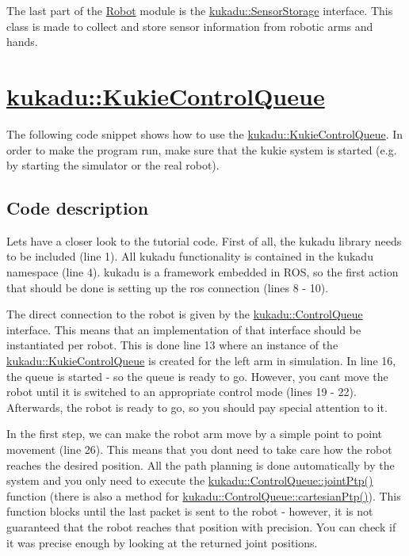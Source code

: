 The last part of the \hyperlink{group__Robot}{Robot} module is the \hyperlink{classkukadu_1_1SensorStorage}{kukadu\+::\+Sensor\+Storage} interface. This class is made to collect and store sensor information from robotic arms and hands.

\section*{\hyperlink{classkukadu_1_1KukieControlQueue}{kukadu\+::\+Kukie\+Control\+Queue}}

The following code snippet shows how to use the \hyperlink{classkukadu_1_1KukieControlQueue}{kukadu\+::\+Kukie\+Control\+Queue}. In order to make the program run, make sure that the kukie system is started (e.\+g. by starting the simulator or the real robot). 
\begin{DoxyCodeInclude}
\end{DoxyCodeInclude}


\subsection*{Code description}

Lets have a closer look to the tutorial code. First of all, the kukadu library needs to be included (line 1). All kukadu functionality is contained in the kukadu namespace (line 4). kukadu is a framework embedded in R\+OS, so the first action that should be done is setting up the ros connection (lines 8 -\/ 10).

The direct connection to the robot is given by the \hyperlink{classkukadu_1_1ControlQueue}{kukadu\+::\+Control\+Queue} interface. This means that an implementation of that interface should be instantiated per robot. This is done line 13 where an instance of the \hyperlink{classkukadu_1_1KukieControlQueue}{kukadu\+::\+Kukie\+Control\+Queue} is created for the left arm in simulation. In line 16, the queue is started -\/ so the queue is ready to go. However, you can\textquotesingle{}t move the robot until it is switched to an appropriate control mode (lines 19 -\/ 22). Afterwards, the robot is ready to go, so you should pay special attention to it.

In the first step, we can make the robot arm move by a simple point to point movement (line 26). This means that you don\textquotesingle{}t need to take care how the robot reaches the desired position. All the path planning is done automatically by the system and you only need to execute the \hyperlink{classkukadu_1_1ControlQueue_ad11059100321b24a1af8ef7de8314353}{kukadu\+::\+Control\+Queue\+::joint\+Ptp()} function (there is also a method for \hyperlink{classkukadu_1_1ControlQueue_a1bfa23a8ce6319f6ef0ed9208e896054}{kukadu\+::\+Control\+Queue\+::cartesian\+Ptp()}). This function blocks until the last packet is sent to the robot -\/ however, it is not guaranteed that the robot reaches that position with precision. You can check if it was precise enough by looking at the returned joint positions.

